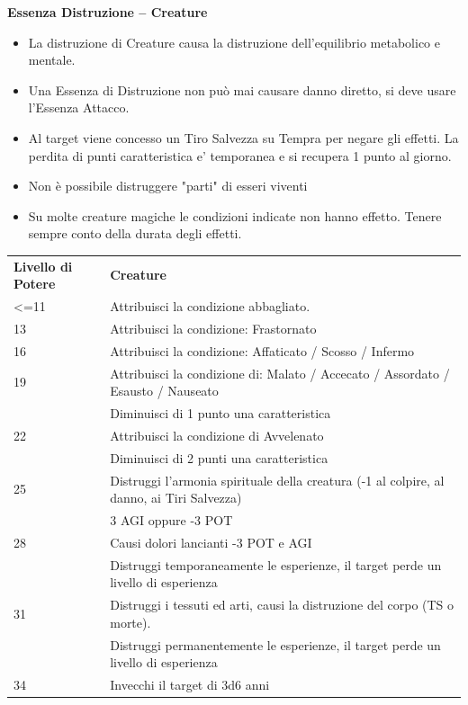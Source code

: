 \documentclass[a4paper,11pt,twoside,openany]{book}
\begin{document}
\textbf{Essenza Distruzione -- Creature}
\begin{itemize}
	\item
	      La distruzione di Creature causa la distruzione dell'equilibrio metabolico e mentale.
	\item
	      Una Essenza di Distruzione non può mai causare danno diretto, si deve usare l'Essenza Attacco.
	\item
	      Al target viene concesso un Tiro Salvezza su Tempra per negare gli effetti. La perdita di punti caratteristica e' temporanea e si recupera 1 punto al giorno.
	\item
	      Non è possibile distruggere "parti" di esseri viventi
	\item
	      Su molte creature magiche le condizioni indicate non hanno effetto. Tenere sempre conto della durata degli effetti.
\end{itemize}

\bigskip

\begin{tabularx}{\textwidth}{lX}
	\toprule
	\textbf{Livello di Potere} & \textbf{Creature}\tabularnewline
	<=11  & Attribuisci la condizione abbagliato.  \\
	13    & Attribuisci la condizione: Frastornato    \\
	16    & Attribuisci la condizione: Affaticato / Scosso / Infermo  \\
	19    & Attribuisci la condizione di: Malato / Accecato / Assordato / Esausto / Nauseato\\
	      & Diminuisci di 1 punto una caratteristica   \\
	22    & Attribuisci la condizione di Avvelenato    \\
	      & Diminuisci di 2 punti una caratteristica   \\
	25    & Distruggi l’armonia spirituale della creatura (-1 al colpire, al danno, ai Tiri Salvezza)\\
	      & 3 AGI oppure -3 POT  \\
	28    & Causi dolori lancianti -3 POT e AGI  \\
	      & Distruggi temporaneamente le esperienze, il target perde un livello di esperienza \\
	31    & Distruggi i tessuti ed arti, causi la distruzione del corpo (TS o morte). \\
	      & Distruggi permanentemente le esperienze, il target perde un livello di esperienza \\
	34    & Invecchi il target di 3d6 anni \\
\end{tabularx}
\end{document}
